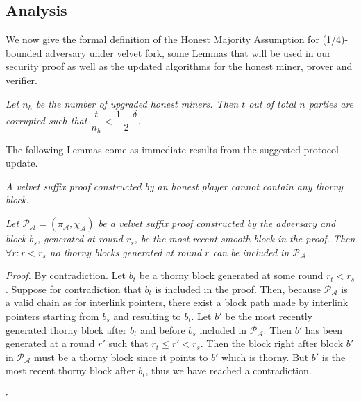 \subsection{Analysis}

We now give the formal definition of the Honest Majority Assumption for (1/4)-bounded adversary under velvet fork, some Lemmas that will be used in our security proof as well as the updated algorithms for the honest miner, prover and verifier.
\begin{definition}
	\textit{Let $n_h$ be the number of upgraded honest miners. Then $t$ out of total $n$
	parties are corrupted such that $\dfrac{t}{n_h} < \dfrac{1 - \delta}{2} $.}
	\label{defn:velvet_honest_majority}
\end{definition}

The following Lemmas come as immediate results from the suggested protocol
update.\\

\begin{lemma}
	\textit{A velvet suffix proof constructed by an honest player cannot contain
	any thorny block.}
	\label{lemm:smooth_honest_suffix}
\end{lemma}

\begin{lemma}
	\textit{Let $\mathcal{P_A} = (\pi_\mathcal{A}, \chi_\mathcal{A})$
	be a velvet suffix proof constructed by the adversary and block $b_s$, generated at round $r_s$, be the most recent smooth block in the proof. Then $\forall r:r < r_s$ no thorny blocks generated at round $r$ can be included in $\mathcal{P_A}$.}
	\label{lemm:smooths_before_smooth}
\end{lemma}
\textit{Proof.} By contradiction. Let $b_t$ be a thorny block generated at some round $r_t < r_s$. Suppose for contradiction that $b_t$ is included in the proof. Then, because $\mathcal{P_A}$ is a valid chain as for interlink pointers, there exist a block path made by interlink pointers starting from $b_s$ and resulting to $b_t$. Let $b'$ be the most recently generated thorny block after $b_t$ and before $b_s$ included in $\mathcal{P_A}$. Then $b'$ has been generated at a round $r'$ such that $r_t \leq r' < r_s$. Then the block right after block $b'$ in $\mathcal{P_A}$ must be a thorny block since it points to $b'$ which is thorny. But $b'$ is the most recent thorny block after $b_t$, thus we have reached a contradiction.
\begin{flushright}
$\square$
\end{flushright}

